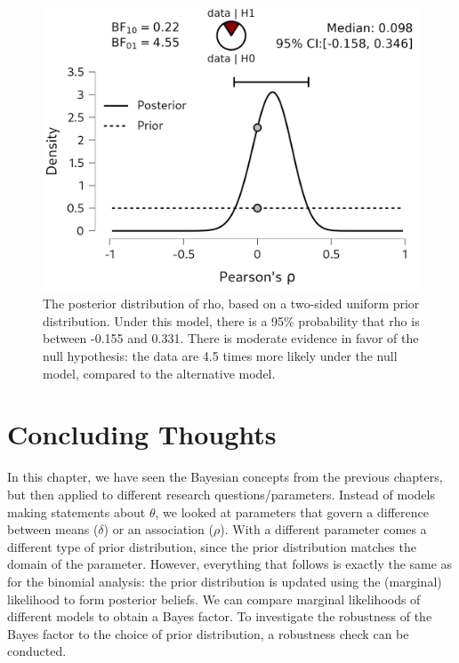 \documentclass[
  letterpaper,
  DIV=11,
  numbers=noendperiod]{scrreprt}
\begin{document}
\begin{figure}

{\centering \includegraphics[width=1\textwidth,height=\textheight]{Figures/CorrelationTestPosterior.png}

}

\caption{The posterior distribution of rho, based on a two-sided uniform
prior distribution. Under this model, there is a 95\% probability that
rho is between -0.155 and 0.331. There is moderate evidence in favor of
the null hypothesis: the data are 4.5 times more likely under the null
model, compared to the alternative model.}

\end{figure}

\hypertarget{concluding-thoughts-3}{%
\section{Concluding Thoughts}\label{concluding-thoughts-3}}

In this chapter, we have seen the Bayesian concepts from the previous
chapters, but then applied to different research questions/parameters.
Instead of models making statements about \(\theta\), we looked at
parameters that govern a difference between means (\(\delta\)) or an
association (\(\rho\)). With a different parameter comes a different
type of prior distribution, since the prior distribution matches the
domain of the parameter. However, everything that follows is exactly the
same as for the binomial analysis: the prior distribution is updated
using the (marginal) likelihood to form posterior beliefs. We can
compare marginal likelihoods of different models to obtain a Bayes
factor. To investigate the robustness of the Bayes factor to the choice
of prior distribution, a robustness check can be conducted.
\end{document}
